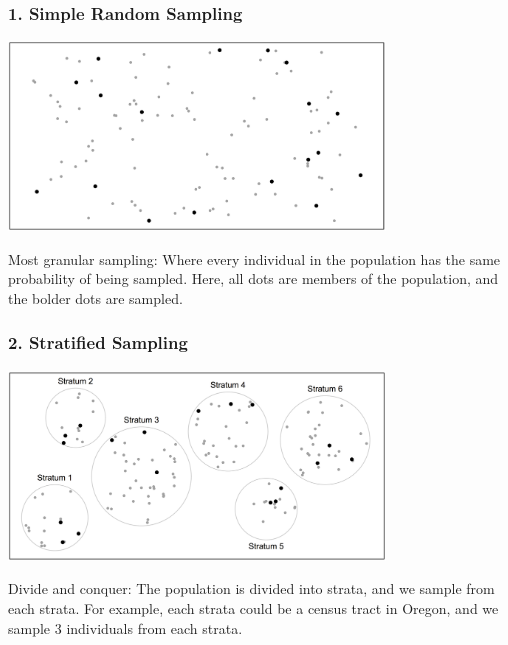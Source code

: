 \documentclass[handout]{beamer}
\newcommand{\blue}[1]{\textcolor{blue2}{#1}}
\begin{document}
\begin{frame}
\frametitle{1. Simple Random Sampling}
\begin{center}
\includegraphics[width=0.75\textwidth]{figure/simple.png}
\end{center}

\blue{Most granular sampling}:  Where every individual in the population has the same probability of being sampled.  \pause Here, all dots are members of the population, and the bolder dots are sampled.  
\end{frame}


\begin{frame}[fragile]
\frametitle{2. Stratified Sampling}

\begin{center}
\includegraphics[width=0.75\textwidth]{figure/stratified.png}
\end{center}

\blue{Divide and conquer}:  The population is divided into strata, and we sample from each strata.  \pause For example, each strata could be a census tract in Oregon, and we sample 3 individuals from each strata.  

\end{frame}
\end{document}
